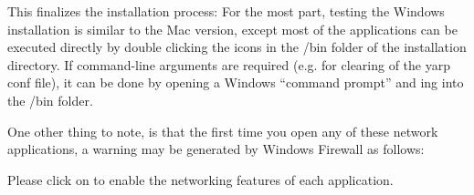\newpage



\newpage
This finalizes the installation process:
\newpage
{}
For the most part, testing the Windows installation is similar to the Mac version, except most of the applications can be executed directly by double clicking the icons in the /bin folder of the installation directory. If command-line arguments are required (e.g. for clearing of the yarp conf file), it can be done by opening a Windows ``command prompt'' and ing into the /bin folder.

One other thing to note, is that the first time you open any of these network applications, a warning may be generated by Windows Firewall as follows:


Please click on  to enable the networking features of each application.

\secondaryEnd{}
\primaryEnd{}

